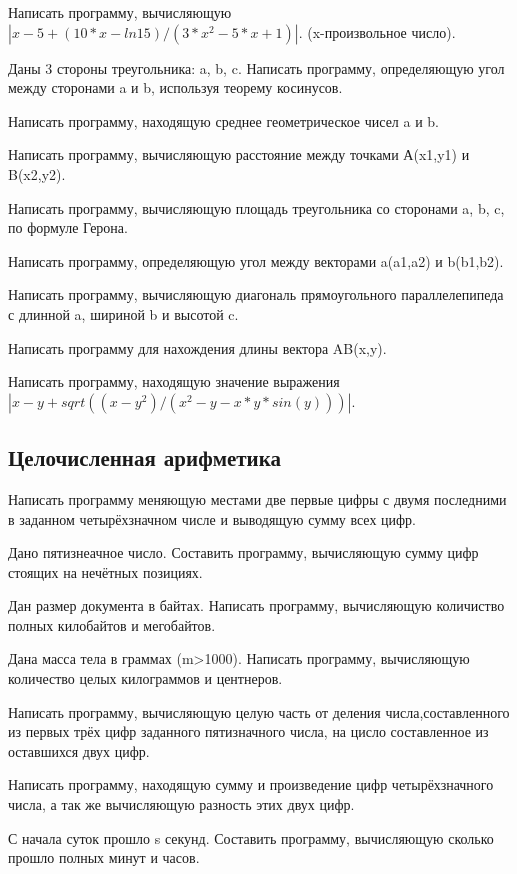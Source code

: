 \task Написать программу, вычисляющую
$|x-5+(10*x-ln15)/(3*x^2-5*x+1)|$. (x-произвольное число).

\task Даны 3 стороны треугольника: a, b, c. Написать программу,
определяющую угол между сторонами a и b, используя теорему косинусов.

\task Написать программу, находящую среднее геометрическое чисел a и
b.

\task Написать программу, вычисляющую расстояние между точками
А(x1,y1) и B(x2,y2).

\task Написать программу, вычисляющую площадь треугольника со
сторонами a, b, c, по формуле Герона.

\task Написать программу, определяющую угол между векторами a(a1,a2) и
b(b1,b2).

\task Написать программу, вычисляющую диагональ прямоугольного
параллелепипеда с длинной a, шириной b и высотой c.

\task Написать программу для нахождения длины вектора AB(x,y).

\task Написать программу, находящую значение выражения
$|x-y+sqrt((x-y^2)/(x^2-y-x*y*sin(y)))|$.


\subsection{Целочисленная арифметика}

\task Написать программу меняющую местами две первые цифры с двумя
последними в заданном четырёхзначном числе и выводящую сумму всех
цифр.

\task Дано пятизнеачное число. Составить программу, вычисляющую сумму
цифр стоящих на нечётных позициях.

\task Дан размер документа в байтах. Написать программу, вычисляющую
количиство полных килобайтов и мегобайтов.

\task Дана масса тела в граммах (m>1000). Написать программу,
вычисляющую количество целых килограммов и центнеров.

\task Написать программу, вычисляющую целую часть от деления
числа,составленного из первых трёх цифр заданного пятизначного числа,
на цисло составленное из оставшихся двух цифр.

\task Написать программу, находящую сумму и произведение цифр
четырёхзначного числа, а так же вычисляющую разность этих двух цифр.

\task С начала суток прошло s секунд. Составить программу, вычисляющую
сколько прошло полных минут и часов.

